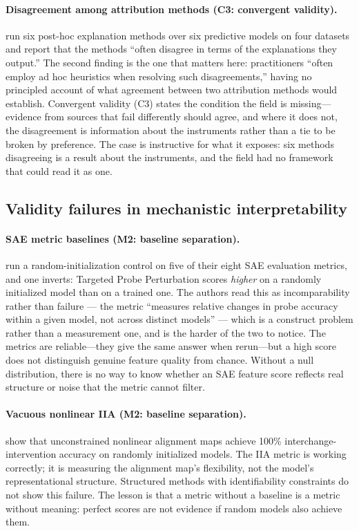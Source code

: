 \documentclass{article}
\begin{document}
\paragraph{Disagreement among attribution methods (C3: convergent validity).}
\citet{krishna2022disagreement} run six post-hoc explanation methods over six predictive models on four datasets and report that the methods ``often disagree in terms of the explanations they output.'' The second finding is the one that matters here: practitioners ``often employ ad hoc heuristics when resolving such disagreements,'' having no principled account of what agreement between two attribution methods would establish. Convergent validity (C3) states the condition the field is missing---evidence from sources that fail differently should agree, and where it does not, the disagreement is information about the instruments rather than a tie to be broken by preference. The case is instructive for what it exposes: six methods disagreeing is a result about the instruments, and the field had no framework that could read it as one.

\subsection{Validity failures in mechanistic interpretability}
\label{sec:mi-failures}

\paragraph{SAE metric baselines (M2: baseline separation).}
\citet{karvonen2025saebench} run a random-initialization control on five of their eight SAE evaluation metrics, and one inverts: Targeted Probe Perturbation scores \emph{higher} on a randomly initialized model than on a trained one. The authors read this as incomparability rather than failure --- the metric ``measures relative changes in probe accuracy within a given model, not across distinct models'' --- which is a construct problem rather than a measurement one, and is the harder of the two to notice. The metrics are reliable---they give the same answer when rerun---but a high score does not distinguish genuine feature quality from chance. Without a null distribution, there is no way to know whether an SAE feature score reflects real structure or noise that the metric cannot filter.

\paragraph{Vacuous nonlinear IIA (M2: baseline separation).}
\citet{sutter2025nonlinear} show that unconstrained nonlinear alignment maps achieve 100\% interchange-intervention accuracy on randomly initialized models. The IIA metric is working correctly; it is measuring the alignment map's flexibility, not the model's representational structure. Structured methods with identifiability constraints do not show this failure. The lesson is that a metric without a baseline is a metric without meaning: perfect scores are not evidence if random models also achieve them.
\end{document}
